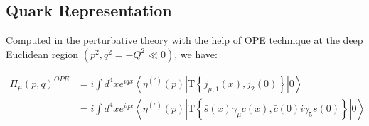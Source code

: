 \subsection{Quark Representation}
Computed in the perturbative theory with the help of OPE technique at the deep Euclidean region $(p^{2}, q^{2} = -Q^{2} \ll 0)$, we have:

\begin{equation}
    \begin{aligned}
        \Pi_\mu(p, q)^{OPE} &= i \int d^4 x e^{i q x}\left\langle \eta^{(\prime)}(p)\left|\mathrm{T}\left\{j_{\mu,1}(x), j_{2}(0)\right\}\right| 0\right\rangle    \\
        &= i \int d^4 x e^{i q x}\left\langle \eta^{(\prime)}(p)\left|\mathrm{T}\left\{\bar{s}(x) \gamma_\mu c(x), \bar{c}(0) i \gamma_5 s(0)\right\}\right| 0\right\rangle 
    \end{aligned}
    \label{eq:quark_rep}
\end{equation}














